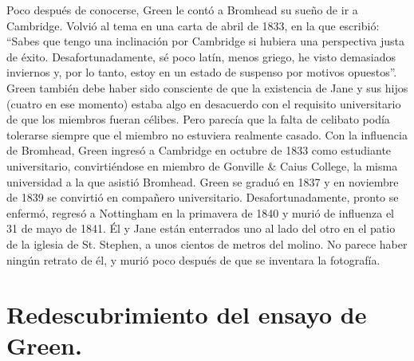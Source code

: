 Poco después de conocerse, Green le contó a Bromhead su sueño de ir a Cambridge. Volvió al tema en una carta de abril de 1833, en la que escribió: \enquote{Sabes que tengo una inclinación por Cambridge si hubiera una perspectiva justa de éxito. Desafortunadamente, sé poco latín, menos griego, he visto demasiados inviernos y, por lo tanto, estoy en un estado de suspenso por motivos opuestos}. Green también debe haber sido consciente de que la existencia de Jane y sus hijos (cuatro en ese momento) estaba algo en desacuerdo con el requisito universitario de que los miembros fueran célibes. Pero parecía que la falta de celibato podía tolerarse siempre que el miembro no estuviera realmente casado. Con la influencia de Bromhead, Green ingresó a Cambridge en octubre de 1833 como estudiante universitario, convirtiéndose en miembro de Gonville $\&$ Caius College, la misma universidad a la que asistió Bromhead. Green se graduó en 1837 y en noviembre de 1839 se convirtió en compañero universitario. Desafortunadamente, pronto se enfermó, regresó a Nottingham en la primavera de 1840 y murió de influenza el 31 de mayo de 1841. Él y Jane están enterrados uno al lado del otro en el patio de la iglesia de St. Stephen, a unos cientos de metros del molino. No parece haber ningún retrato de él, y murió poco después de que se inventara la fotografía.

\section{Redescubrimiento del ensayo de Green.}

